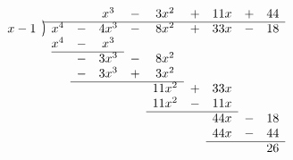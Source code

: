 \documentclass[preview]{standalone}
\newcommand{\longdiv}{\smash{\mkern-0.43mu\vstretch{1.31}{\hstretch{.7}{)}}\mkern-5.2mu\vstretch{1.31}{\hstretch{.7}{)}}}}
\begin{document}
\begin{equation*}
    \begin{array}{*1r @{\hskip\arraycolsep}c@{\hskip\arraycolsep} *{9}c}
      &          &     &   & x^3  & - & 3x^2  & + & 11x & + & 44\\
        \cline{2-11}
x - 1 & \longdiv & x^4 & - & 4x^3 & - & 8x^2  & + & 33x & - & 18\\
      &          & x^4 & - & x^3  &   &       &   &     &   & \\
        \cline{3-5}
      &          &     & - & 3x^3 & - & 8x^2  &   &     &   & \\
      &          &     & - & 3x^3 & + & 3x^2  &   &     &   & \\
        \cline{4-7}
      &          &     &   &      &   & 11x^2 & + & 33x &   & \\
      &          &     &   &      &   & 11x^2 & - & 11x &   & \\
        \cline{7-9}
      &          &     &   &      &   &       &   & 44x & - & 18\\
      &          &     &   &      &   &       &   & 44x & - & 44\\
        \cline{9-11}
      &          &     &   &      &   &       &   &     &   & 26\\
\end{array}
\end{equation*}
\end{document}
